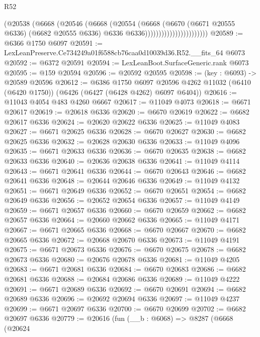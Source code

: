 \begin{lexlean}{R52}
\begin{coremodule}
                                    (@20538
                                      (@6668
                                        (@20546
                                          (@6668
                                            (@20554
                                              (@6668
                                                (@6670
                                                  (@6671 @20555 @6336)
                                                  (@6682 @20555 @6336)
                                                  @6336
                                                  @6336)))))))))))))))))))))))
@20589 := @6366 @1750 @6097
@20591 := LexLeanPreserve.Ce734249a01f6588cb76caa0d10039d36.R52.__fits_64 @6073
@20592 := @6372 @20591
@20594 := LexLeanBoot.SurfaceGeneric.rank @6073
@20595 := @159 @20594
@20596 := @20592 @20595
@20598 := (key : @6093) -> @20589 @20596
@20612 := @6386
    @1750
    @6097
    @20596
    @4262
    @11032
    (@6410 (@6420 @1750))
    (@6426 (@6427 (@6428 @4262) @6097 @6404))
@20616 := @11043 @4054 @483 @4260 @6667
@20617 := @11049 @4073
@20618 := @6671 @20617
@20619 := @20618 @6336
@20620 := @6670 @20619
@20622 := @6682 @20617 @6336
@20624 := @20620 @20622 @6336
@20625 := @11049 @4083
@20627 := @6671 @20625 @6336
@20628 := @6670 @20627
@20630 := @6682 @20625 @6336
@20632 := @20628 @20630 @6336
@20633 := @11049 @4096
@20635 := @6671 @20633 @6336
@20636 := @6670 @20635
@20638 := @6682 @20633 @6336
@20640 := @20636 @20638 @6336
@20641 := @11049 @4114
@20643 := @6671 @20641 @6336
@20644 := @6670 @20643
@20646 := @6682 @20641 @6336
@20648 := @20644 @20646 @6336
@20649 := @11049 @4132
@20651 := @6671 @20649 @6336
@20652 := @6670 @20651
@20654 := @6682 @20649 @6336
@20656 := @20652 @20654 @6336
@20657 := @11049 @4149
@20659 := @6671 @20657 @6336
@20660 := @6670 @20659
@20662 := @6682 @20657 @6336
@20664 := @20660 @20662 @6336
@20665 := @11049 @4171
@20667 := @6671 @20665 @6336
@20668 := @6670 @20667
@20670 := @6682 @20665 @6336
@20672 := @20668 @20670 @6336
@20673 := @11049 @4191
@20675 := @6671 @20673 @6336
@20676 := @6670 @20675
@20678 := @6682 @20673 @6336
@20680 := @20676 @20678 @6336
@20681 := @11049 @4205
@20683 := @6671 @20681 @6336
@20684 := @6670 @20683
@20686 := @6682 @20681 @6336
@20688 := @20684 @20686 @6336
@20689 := @11049 @4222
@20691 := @6671 @20689 @6336
@20692 := @6670 @20691
@20694 := @6682 @20689 @6336
@20696 := @20692 @20694 @6336
@20697 := @11049 @4237
@20699 := @6671 @20697 @6336
@20700 := @6670 @20699
@20702 := @6682 @20697 @6336
@20779 := @20616
    (fun (__b : @6068) =>
    @8287
      (@6668
        (@20624

\end{coremodule}
\end{lexlean}
